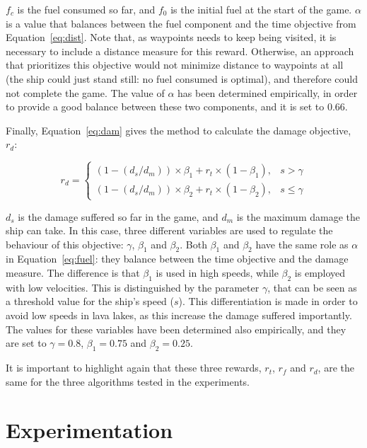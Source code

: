 \documentclass[journal]{IEEEtran}
\begin{document}
$f_c$ is the fuel consumed so far, and $f_0$ is the initial fuel at the start of the game. $\alpha$ is a value that balances between the fuel component and the time objective from Equation~\ref{eq:dist}. Note that, as waypoints needs to keep being visited, it is necessary to include a distance measure for this reward. Otherwise, an approach that prioritizes this objective would not minimize distance to waypoints at all (the ship could just stand still: no fuel consumed is optimal), and therefore could not complete the game. The value of $\alpha$ has been determined empirically, in order to provide a good balance between these two components, and it is set to $0.66$.

Finally, Equation~\ref{eq:dam} gives the method to calculate the damage objective, $r_d$:


\begin{equation}	\label{eq:dam}
r_d = 
\begin{cases}
	(1 - (d_s/d_m)) \times \beta_{1} + r_t \times (1 - \beta_{1}), & s > \gamma\\
	(1 - (d_s/d_m)) \times \beta_{2} + r_t \times (1 - \beta_{2}), & s \leq \gamma
\end{cases}
\end{equation}

$d_s$ is the damage suffered so far in the game, and $d_m$ is the maximum damage the ship can take. In this case, three different variables are used to regulate the behaviour of this objective: $\gamma$, $\beta_{1}$ and $\beta_{2}$. Both $\beta_{1}$ and $\beta_{2}$ have the same role as $\alpha$ in Equation~\ref{eq:fuel}: they balance between the time objective and the damage measure. The difference is that $\beta_{1}$ is used in high speeds, while $\beta_{2}$ is employed with low velocities. This is distinguished by the parameter $\gamma$, that can be seen as a threshold value for the ship's speed ($s$). This differentiation is made in order to avoid low speeds in lava lakes, as this increase the damage suffered importantly. The values for these variables have been determined also empirically, and they are set to $\gamma = 0.8$, $\beta_{1} = 0.75$ and $\beta_{2} = 0.25$.

It is important to highlight again that these three rewards, $r_t$, $r_f$ and $r_d$, are the same for the three algorithms tested in the experiments. 

\section{Experimentation} \label{sec:exp}
\end{document}

